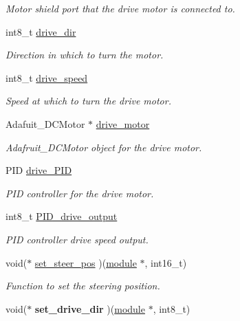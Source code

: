 \begin{DoxyCompactItemize}
\begin{DoxyCompactList}\small\item\em Motor shield port that the drive motor is connected to. \end{DoxyCompactList}\item 
int8\+\_\+t \hyperlink{structmodule__assembly_a4eaba2980fc35d71f1cc2ec15251cf15}{drive\+\_\+dir}
\begin{DoxyCompactList}\small\item\em Direction in which to turn the motor. \end{DoxyCompactList}\item 
int8\+\_\+t \hyperlink{structmodule__assembly_a82019a65507cc9a23d7cdcff82adc20b}{drive\+\_\+speed}
\begin{DoxyCompactList}\small\item\em Speed at which to turn the drive motor. \end{DoxyCompactList}\item 
Adafuit\+\_\+\+D\+C\+Motor $\ast$ \hyperlink{structmodule__assembly_a1c4ce1de4be6b0d640e508245ac5f281}{drive\+\_\+motor}
\begin{DoxyCompactList}\small\item\em Adafruit\+\_\+\+D\+C\+Motor object for the drive motor. \end{DoxyCompactList}\item 
P\+I\+D \hyperlink{structmodule__assembly_ae46a075e88844adda6fd552f87f305c0}{drive\+\_\+\+P\+I\+D}
\begin{DoxyCompactList}\small\item\em P\+I\+D controller for the drive motor. \end{DoxyCompactList}\item 
int8\+\_\+t \hyperlink{structmodule__assembly_a987ebb08eef885c780ce16cb747ad4b8}{P\+I\+D\+\_\+drive\+\_\+output}
\begin{DoxyCompactList}\small\item\em P\+I\+D controller drive speed output. \end{DoxyCompactList}\item 
\hypertarget{structmodule__assembly_addb74ab561efcea659665a3f82daf31d}{}void($\ast$ \hyperlink{structmodule__assembly_addb74ab561efcea659665a3f82daf31d}{set\+\_\+steer\+\_\+pos} )(\hyperlink{structmodule__assembly}{module} $\ast$, int16\+\_\+t)\label{structmodule__assembly_addb74ab561efcea659665a3f82daf31d}

\begin{DoxyCompactList}\small\item\em Function to set the steering position. \end{DoxyCompactList}\item 
\hypertarget{structmodule__assembly_a9b5fb65d6b3dff348c59fbd8b1cf016a}{}void($\ast$ {\bfseries set\+\_\+drive\+\_\+dir} )(\hyperlink{structmodule__assembly}{module} $\ast$, int8\+\_\+t)\label{structmodule__assembly_a9b5fb65d6b3dff348c59fbd8b1cf016a}


\end{DoxyCompactItemize}
